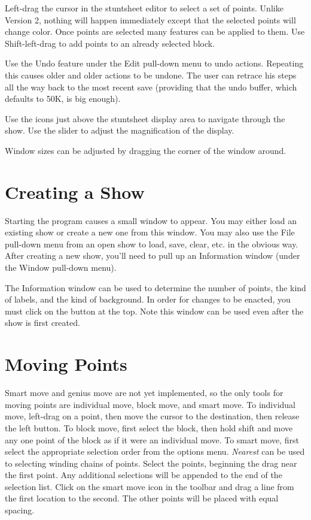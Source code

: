 Left-drag the cursor in the stuntsheet editor to select a set of points.
Unlike Version 2, nothing will happen immediately except that the
selected points will change color.  Once points are selected many
features can be applied to them.  Use Shift-left-drag to add points to
an already selected block.

Use the Undo feature under the Edit pull-down menu to undo actions.
Repeating this causes older and older actions to be undone.  The user
can retrace his steps all the way back to the most recent save
(providing that the undo buffer, which defaults to 50K, is big enough).

Use the icons just above the stuntsheet display area to navigate through
the show.  Use the slider to adjust the magnification of the display.

Window sizes can be adjusted by dragging the corner of the window
around.

\section{Creating a Show}\label{newshow}

Starting the program causes a small window to appear.  You may either
load an existing show or create a new one from this window.  You may
also use the File pull-down menu from an open show to load, save, clear,
etc. in the obvious way.  After creating a new show, you'll need to pull
up an Information window (under the Window pull-down menu).

The Information window can be used to determine the number of points, the
kind of labels, and the kind of background.  In order for changes to be
enacted, you must click on the button at the top.  Note this window can be
used even after the show is first created.

\section{Moving Points}\label{movement}

Smart move and genius move are not yet implemented, so the only tools for
moving points are individual move, block move, and smart move.  To
individual move, left-drag on a point, then move the cursor to the
destination, then release the left button.  To block move, first select
the block, then hold shift and move any one point of the block as if it
were an individual move.  To smart move, first select the appropriate
selection order from the options menu.  {\it Nearest} can be used to
selecting winding chains of points.  Select the points, beginning the
drag near the first point.  Any additional selections will be appended to
the end of the selection list.  Click on the smart move icon in the
toolbar and drag a line from the first location to the second.  The
other points will be placed with equal spacing.

